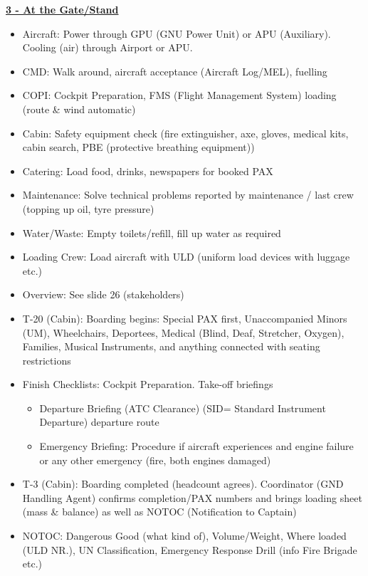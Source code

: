 \documentclass[9pt, landscape, fleqn]{scrartcl}
\begin{document}
\begin{multicols*}{3}
\begin{itemize}
\end{itemize}
\underline{\textbf{3 - At the Gate/Stand}}
\begin{itemize}
    \item Aircraft: Power through GPU (GNU Power Unit) or APU (Auxiliary). Cooling (air) through Airport or APU.
    \item CMD: Walk around, aircraft acceptance (Aircraft Log/MEL), fuelling
    \item COPI: Cockpit Preparation, FMS (Flight Management System) loading (route \& wind automatic)
    \item Cabin: Safety equipment check (fire extinguisher, axe, gloves, medical kits, cabin search, PBE (protective breathing equipment))
    \item Catering: Load food, drinks, newspapers for booked PAX 
    \item Maintenance: Solve technical problems reported by maintenance / last crew (topping up oil, tyre pressure)
    \item Water/Waste: Empty toilets/refill, fill up water as required
    \item Loading Crew: Load aircraft with ULD (uniform load devices with luggage etc.) 
    \item Overview: See slide 26 (stakeholders)
    \item T-20 (Cabin): Boarding begins: Special PAX first, Unaccompanied Minors (UM), Wheelchairs, Deportees, Medical (Blind, Deaf, Stretcher, Oxygen), Families, Musical Instruments, and anything connected with seating restrictions
    \item Finish Checklists: Cockpit Preparation. Take-off briefings
    \begin{itemize}
        \item Departure Briefing (ATC Clearance) (SID= Standard Instrument Departure) departure route 
        \item Emergency Briefing: Procedure if aircraft experiences and engine failure or any other emergency (fire, both engines damaged)
    \end{itemize}
    \item T-3 (Cabin): Boarding completed (headcount agrees). Coordinator (GND Handling Agent) confirms completion/PAX numbers and brings loading sheet (mass \& balance) as well as NOTOC (Notification to Captain)
    \item NOTOC: Dangerous Good (what kind of), Volume/Weight, Where loaded (ULD NR.), UN Classification, Emergency Response Drill (info Fire Brigade etc.)

\end{itemize}
\end{multicols*}
\end{document}
